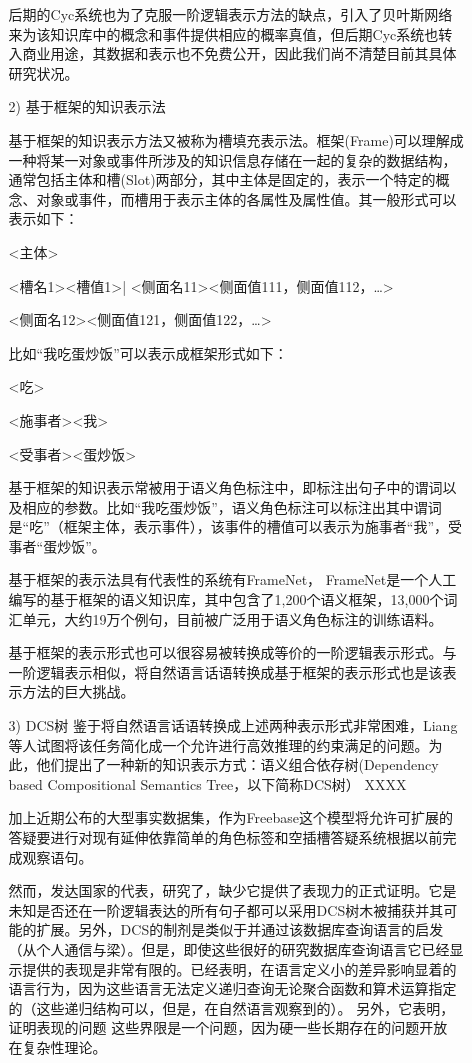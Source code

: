 \begin{enumerate}
\begin{enumerate}
后期的Cyc系统也为了克服一阶逻辑表示方法的缺点，引入了贝叶斯网络来为该知识库中的概念和事件提供相应的概率真值，但后期Cyc系统也转入商业用途，其数据和表示也不免费公开，因此我们尚不清楚目前其具体研究状况。

\item[2)] 基于框架的知识表示法

基于框架的知识表示方法又被称为槽填充表示法。框架(Frame)可以理解成一种将某一对象或事件所涉及的知识信息存储在一起的复杂的数据结构，通常包括主体和槽(Slot)两部分，其中主体是固定的，表示一个特定的概念、对象或事件，而槽用于表示主体的各属性及属性值。其一般形式可以表示如下：

       <主体>  

       <槽名1><槽值1>| <侧面名11><侧面值111，侧面值112，…>

                                    <侧面名12><侧面值121，侧面值122，…>

比如“我吃蛋炒饭”可以表示成框架形式如下：

       <吃>  

       <施事者><我>

       <受事者><蛋炒饭>


基于框架的知识表示常被用于语义角色标注中，即标注出句子中的谓词以及相应的参数。比如“我吃蛋炒饭”，语义角色标注可以标注出其中谓词是“吃”（框架主体，表示事件），该事件的槽值可以表示为施事者“我”，受事者“蛋炒饭”。

基于框架的表示法具有代表性的系统有FrameNet\cite{Atkins1995}， FrameNet是一个人工编写的基于框架的语义知识库，其中包含了1,200个语义框架，13,000个词汇单元，大约19万个例句，目前被广泛用于语义角色标注的训练语料。

基于框架的表示形式也可以很容易被转换成等价的一阶逻辑表示形式。与一阶逻辑表示相似，将自然语言话语转换成基于框架的表示形式也是该表示方法的巨大挑战。

\item[3)] DCS树\cite{Liang2013}
鉴于将自然语言话语转换成上述两种表示形式非常困难，Liang等人\cite{Liang2013}试图将该任务简化成一个允许进行高效推理的约束满足的问题。为此，他们提出了一种新的知识表示方式：语义组合依存树(Dependency based  Compositional Semantics Tree，以下简称DCS树）
 XXXX

加上近期公布的大型事实数据集，作为Freebase\cite{Bollacker2008}这个模型将允许可扩展的答疑要进行对现有延伸依靠简单的角色标签和空插槽答疑系统根据以前完成观察语句。

然而，发达国家的代表，研究了\cite{Liang2011}，缺少它提供了表现力的正式证明。它是未知是否还在一阶逻辑表达的所有句子都可以采用DCS树木被捕获并其可能的扩展。另外，DCS的制剂是类似于并通过该数据库查询语言的启发（从个人通信与梁）。但是，即使这些很好的研究数据库查询语言它已经显示提供的表现是非常有限的\cite{Libkin2001}。已经表明，在语言定义小的差异影响显着的语言行为，因为这些语言无法定义递归查询无论聚合函数和算术运算指定的（这些递归结构可以，但是，在自然语言观察到的）。
另外，它表明，证明表现的问题
这些界限是一个问题，因为硬一些长期存在的问题开放
在复杂性理论\cite{Libkin2001}。


\end{enumerate}
\end{enumerate}
